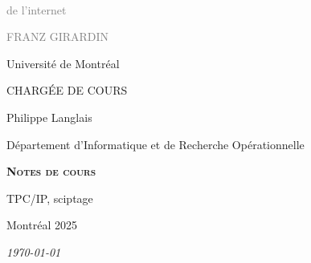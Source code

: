 \documentclass[a4paper, 14pt]{report}
\begin{document}
\frontmatter                    %
\begin{titlepage}
    \centering
    \vspace*{1cm}

    \\
    \vspace{0.2cm}%
    {\LARGE\sffamily\textcolor{gray}{de l'internet}}\par 
    \vspace{4cm}%
    {\LARGE\textcolor{gray}{\sffamily FRANZ GIRARDIN
        }
    }\par%
    {\large\sffamily Université de Montréal}
    \par%
    
    \vspace{1cm}
    
    {\large\sffamily CHARGÉE DE COURS}\par
    {\normalsize\sffamily Philippe Langlais}\par
    {\small\sffamily 
        Département d'Informatique et de Recherche Opérationnelle
    }\par%
    \vspace{1cm}
    
    {\large\textsc
        {\sffamily \textbf
            {Notes de cours}  
        }%
    }\par
    {\normalsize\sffamily 
            TPC/IP, sciptage
    }\par
    \vfill
    {\Large\sffamily Montréal 2025}\par
    {\small\sffamily\textit{\today}}

\end{titlepage}
\pagebreak


\thispagestyle{plain}
\tableofcontents



\mainmatter                     %
\thispagestyle{plain}           %
\end{document}
